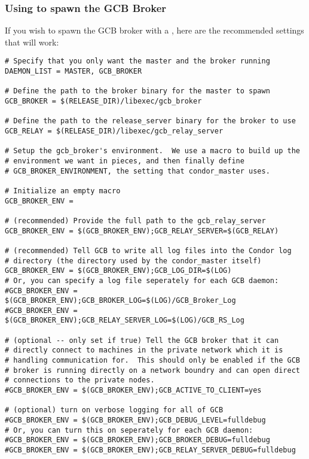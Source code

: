 \subsubsection{\label{sec:GCB-condor-master-spawn}
Using  to spawn the GCB Broker}

If you wish to spawn the GCB broker with a , here are 
the recommended  settings that will work:

\footnotesize
\begin{verbatim}
# Specify that you only want the master and the broker running
DAEMON_LIST = MASTER, GCB_BROKER

# Define the path to the broker binary for the master to spawn
GCB_BROKER = $(RELEASE_DIR)/libexec/gcb_broker

# Define the path to the release_server binary for the broker to use 
GCB_RELAY = $(RELEASE_DIR)/libexec/gcb_relay_server

# Setup the gcb_broker's environment.  We use a macro to build up the
# environment we want in pieces, and then finally define
# GCB_BROKER_ENVIRONMENT, the setting that condor_master uses.

# Initialize an empty macro
GCB_BROKER_ENV =

# (recommended) Provide the full path to the gcb_relay_server
GCB_BROKER_ENV = $(GCB_BROKER_ENV);GCB_RELAY_SERVER=$(GCB_RELAY)

# (recommended) Tell GCB to write all log files into the Condor log
# directory (the directory used by the condor_master itself)
GCB_BROKER_ENV = $(GCB_BROKER_ENV);GCB_LOG_DIR=$(LOG)
# Or, you can specify a log file seperately for each GCB daemon:
#GCB_BROKER_ENV = $(GCB_BROKER_ENV);GCB_BROKER_LOG=$(LOG)/GCB_Broker_Log
#GCB_BROKER_ENV = $(GCB_BROKER_ENV);GCB_RELAY_SERVER_LOG=$(LOG)/GCB_RS_Log

# (optional -- only set if true) Tell the GCB broker that it can
# directly connect to machines in the private network which it is
# handling communication for.  This should only be enabled if the GCB
# broker is running directly on a network boundry and can open direct
# connections to the private nodes.
#GCB_BROKER_ENV = $(GCB_BROKER_ENV);GCB_ACTIVE_TO_CLIENT=yes

# (optional) turn on verbose logging for all of GCB
#GCB_BROKER_ENV = $(GCB_BROKER_ENV);GCB_DEBUG_LEVEL=fulldebug
# Or, you can turn this on seperately for each GCB daemon:
#GCB_BROKER_ENV = $(GCB_BROKER_ENV);GCB_BROKER_DEBUG=fulldebug
#GCB_BROKER_ENV = $(GCB_BROKER_ENV);GCB_RELAY_SERVER_DEBUG=fulldebug


\end{verbatim}
